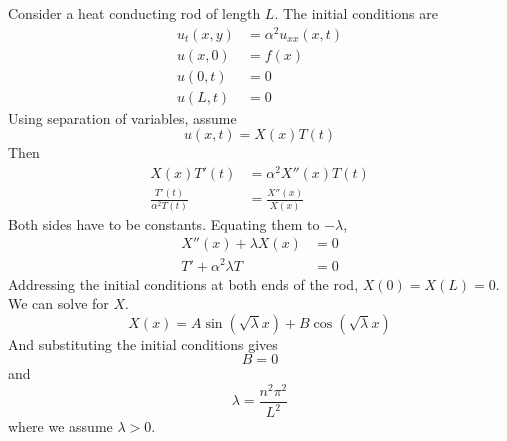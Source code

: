 \documentclass[12pt]{article}
\begin{document}
\begin{ex}
	Consider a heat conducting rod of length $L$. The initial conditions are
	\begin{align*}
		u_t(x,y) &= \alpha^2u_{xx}(x,t) \\
		u(x,0) &= f(x) \\
		u(0,t) &= 0 \\
		u(L,t) &= 0
	\end{align*}
	Using separation of variables, assume
	$$u(x,t) = X(x)T(t)$$
	Then
	\begin{align*}
		X(x)T'(t) &= \alpha^2X''(x)T(t) \\
		\frac{T'(t)}{\alpha^2T(t)} &= \frac{X''(x)}{X(x)}
	\end{align*}
	Both sides have to be constants. Equating them to $-\lambda$,
	\begin{align*}
		X''(x) + \lambda X(x) &= 0 \\
		T' + \alpha^2\lambda T &= 0
	\end{align*}
	Addressing the initial conditions at both ends of the rod, $X(0) = X(L) = 0$. We can solve for $X$.
	$$X(x) = A\sin(\sqrt{\lambda}x) + B\cos(\sqrt{\lambda}x)$$
	And substituting the initial conditions gives
	$$B=0$$
	and
	$$\lambda = \frac{n^2\pi^2}{L^2}$$
	where we assume $\lambda > 0$.
\end{ex}
\end{document}
